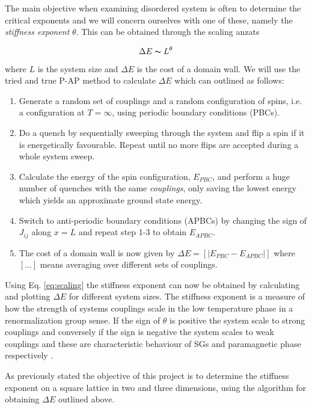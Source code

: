 \documentclass[paper=a4, fontsize=11pt]{scrartcl} %
\numberwithin{equation}{section} %
\numberwithin{figure}{section} %
\numberwithin{table}{section} %
\newcommand{\commutator}[1]{\ensuremath{\left[ #1 \right]}}
\begin{document}
The main objective when examining disordered system is often to determine the critical exponents and we will concern ourselves with one of these, namely the \emph{stiffness exponent} $\theta$. This can be obtained through the scaling anzats

\begin{equation}
\Delta E \thicksim L^\theta
\label{eq:scaling}
\end{equation}
where $L$ is the system size and $\Delta E$ is the cost of a domain wall. We will use the tried and true P-AP method\cite{hartmann}\cite{carter} to calculate $\Delta E$ which can outlined as follows:

\begin{enumerate}
\item Generate a random set of couplings and a random configuration of spins, i.e. a configuration at $T=\infty$, using periodic boundary conditions (PBCs).
\item Do a quench by sequentially sweeping through the system and flip a spin if it is energetically favourable. Repeat until no more flips are accepted during a whole system sweep.
\item Calculate the energy of the spin configuration, $E_{PBC}$, and perform a huge number of quenches with the same \emph{couplings}, only saving the lowest energy which yields an approximate ground state energy.
\item Switch to anti-periodic boundary conditions (APBCs) by changing the sign of $J_{ij}$ along $x=L$ and repeat step 1-3 to obtain $E_{APBC}$.
\item The cost of a domain wall is now given by $\Delta E = \commutator{|E_{PBC}-E_{APBC}|}$ where $[...]$ means averaging over different sets of couplings.
\end{enumerate}
Using Eq. \eqref{eq:scaling} the stiffness exponent can now be obtained by calculating and plotting $\Delta E$ for different system sizes. The stiffness exponent is a measure of how the strength of systems couplings scale in the low temperature phase in a renormalization group sense. If the sign of $\theta$ is positive the system scale to strong couplings and conversely if the sign is negative the system scales to weak couplings and these are characteristic behaviour of SGs and paramagnetic phase respectively \cite{almeida}. 

As previously stated the objective of this project is to determine the stiffness exponent on a square lattice in two and three dimensions, using the algorithm for obtaining $\Delta E$ outlined above.
\end{document}

